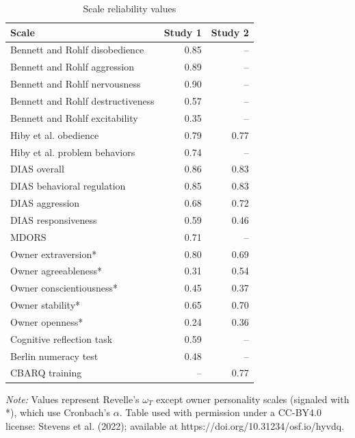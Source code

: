 \documentclass[
  doc]{apa6}
\begin{document}
\begin{table}[!h]

\caption{\label{tab:reliability}Scale reliability values}
\centering
\begin{threeparttable}
\begin{tabular}[t]{lrr}
\toprule
Scale & Study 1 & Study 2\\
\midrule
Bennett and Rohlf disobedience & 0.85 & --\\
Bennett and Rohlf aggression & 0.89 & --\\
Bennett and Rohlf nervousness & 0.90 & --\\
Bennett and Rohlf destructiveness & 0.57 & --\\
Bennett and Rohlf excitability & 0.35 & --\\
Hiby et al. obedience & 0.79 & 0.77\\
Hiby et al. problem behaviors & 0.74 & --\\
DIAS overall & 0.86 & 0.83\\
DIAS behavioral regulation & 0.85 & 0.83\\
DIAS aggression & 0.68 & 0.72\\
DIAS responsiveness & 0.59 & 0.46\\
MDORS & 0.71 & --\\
Owner extraversion* & 0.80 & 0.69\\
Owner agreeableness* & 0.31 & 0.54\\
Owner conscientiousness* & 0.45 & 0.37\\
Owner stability* & 0.65 & 0.70\\
Owner openness* & 0.24 & 0.36\\
Cognitive reflection task & 0.59 & --\\
Berlin numeracy test & 0.48 & --\\
CBARQ training & -- & 0.77\\
\bottomrule
\end{tabular}
\begin{tablenotes}
\item \newline\textit{Note: }  Values represent Revelle's $\omega_{T}$ except owner personality scales (signaled with *), which use Cronbach's $\alpha$. Table used with permission under a CC-BY4.0 license: Stevens et al. (2022); available at https://doi.org/10.31234/osf.io/hyvdq.
\end{tablenotes}
\end{threeparttable}
\end{table}
\end{document}

